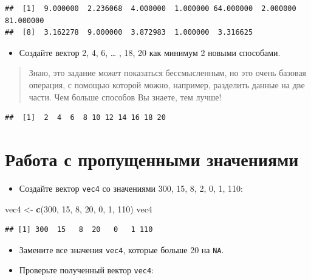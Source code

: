 \documentclass[]{book}
\newenvironment{Shaded}{\begin{snugshade}}{\end{snugshade}}
\newcommand{\KeywordTok}[1]{\textcolor[rgb]{0.13,0.29,0.53}{\textbf{#1}}}
\newcommand{\DecValTok}[1]{\textcolor[rgb]{0.00,0.00,0.81}{#1}}
\newcommand{\StringTok}[1]{\textcolor[rgb]{0.31,0.60,0.02}{#1}}
\newcommand{\NormalTok}[1]{#1}
\providecommand{\tightlist}{%
  \setlength{\itemsep}{0pt}\setlength{\parskip}{0pt}}
\begin{document}
\begin{verbatim}
##  [1]  9.000000  2.236068  4.000000  1.000000 64.000000  2.000000 81.000000
##  [8]  3.162278  9.000000  3.872983  1.000000  3.316625
\end{verbatim}

\begin{itemize}
\tightlist
\item
  Создайте вектор 2, 4, 6, \ldots{} , 18, 20 как минимум 2 новыми
  способами.
\end{itemize}

\begin{quote}
Знаю, это задание может показаться бессмысленным, но это очень базовая
операция, с помощью которой можно, например, разделить данные на две
части. Чем больше способов Вы знаете, тем лучше!
\end{quote}

\begin{verbatim}
##  [1]  2  4  6  8 10 12 14 16 18 20
\end{verbatim}

\section{Работа с пропущенными значениями}\label{task_na}

\begin{itemize}
\tightlist
\item
  Создайте вектор \texttt{vec4} со значениями 300, 15, 8, 2, 0, 1, 110:
\end{itemize}

\begin{Shaded}
\begin{Highlighting}[]
\NormalTok{vec4 <-}\StringTok{ }\KeywordTok{c}\NormalTok{(}\DecValTok{300}\NormalTok{, }\DecValTok{15}\NormalTok{, }\DecValTok{8}\NormalTok{, }\DecValTok{20}\NormalTok{, }\DecValTok{0}\NormalTok{, }\DecValTok{1}\NormalTok{, }\DecValTok{110}\NormalTok{)}
\NormalTok{vec4}
\end{Highlighting}
\end{Shaded}

\begin{verbatim}
## [1] 300  15   8  20   0   1 110
\end{verbatim}

\begin{itemize}
\item
  Замените все значения \texttt{vec4}, которые больше 20 на \texttt{NA}.
\item
  Проверьте полученный вектор \texttt{vec4}:
\end{itemize}
\end{document}
